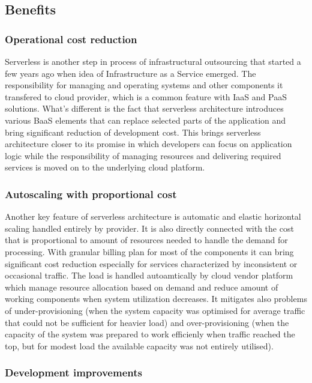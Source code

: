 \subsection{Benefits}

\subsubsection*{Operational cost reduction}

Serverless is another step in process of infrastructural outsourcing that started a few years ago when idea of Infrastructure as a Service emerged. 
The responsibility for managing and operating systems and other components it transfered to cloud provider, which is a common feature with IaaS and PaaS solutions.
What's different is the fact that serverless architecture introduces various BaaS elements that can replace selected parts of the application and bring significant reduction of development cost.
This brings serverless architecture closer to its promise in which developers can focus on application logic while the responsibility of managing resources and delivering required services is moved on to the underlying cloud platform.

\subsubsection*{Autoscaling with proportional cost}

Another key feature of serverless architecture is automatic and elastic horizontal scaling handled entirely by provider. 
It is also directly connected with the cost that is proportional to amount of resources needed to handle the demand for processing. 
With granular billing plan for most of the components it can bring significant cost reduction especially for services characterized by inconsistent or occasional traffic.
The load is handled autoamtically by cloud vendor platform which manage resource allocation based on demand and reduce amount of working components when system utilization decreases. 
It mitigates also problems of under-provisioning (when the system capacity was optimised for average traffic that could not be sufficient for heavier load) and over-provisioning (when the capacity of the system was prepared to work efficienly when traffic reached the top, but for modest load the available capacity was not entirely utilised).

\subsubsection*{Development improvements}

